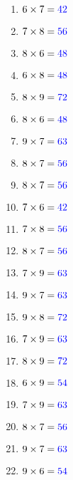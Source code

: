 \documentclass[11pt]{article}\usepackage[a4paper,margin=0.90in,tmargin=0.5in]{geometry}\usepackage{amsmath, amsthm, amssymb}
\begin{document}
\begin{multicols*}{4}
\begin{enumerate}[itemsep=2.3\baselineskip]
\item $6 \times 7 = { \color[rgb]{0,0,1} 42 }$ 
\item $7 \times 8 = { \color[rgb]{0,0,1} 56 }$ 
\item $8 \times 6 = { \color[rgb]{0,0,1} 48 }$ 
\item $6 \times 8 = { \color[rgb]{0,0,1} 48 }$ 
\item $8 \times 9 = { \color[rgb]{0,0,1} 72 }$ 
\item $8 \times 6 = { \color[rgb]{0,0,1} 48 }$ 
\item $9 \times 7 = { \color[rgb]{0,0,1} 63 }$ 
\item $8 \times 7 = { \color[rgb]{0,0,1} 56 }$ 
\item $8 \times 7 = { \color[rgb]{0,0,1} 56 }$ 
\item $7 \times 6 = { \color[rgb]{0,0,1} 42 }$ 
\item $7 \times 8 = { \color[rgb]{0,0,1} 56 }$ 
\item $8 \times 7 = { \color[rgb]{0,0,1} 56 }$ 
\item $7 \times 9 = { \color[rgb]{0,0,1} 63 }$ 
\item $9 \times 7 = { \color[rgb]{0,0,1} 63 }$ 
\item $9 \times 8 = { \color[rgb]{0,0,1} 72 }$ 
\item $7 \times 9 = { \color[rgb]{0,0,1} 63 }$ 
\item $8 \times 9 = { \color[rgb]{0,0,1} 72 }$ 
\item $6 \times 9 = { \color[rgb]{0,0,1} 54 }$ 
\item $7 \times 9 = { \color[rgb]{0,0,1} 63 }$ 
\item $8 \times 7 = { \color[rgb]{0,0,1} 56 }$ 
\item $9 \times 7 = { \color[rgb]{0,0,1} 63 }$ 
\item $9 \times 6 = { \color[rgb]{0,0,1} 54 }$ 
\end{enumerate}
\vfill
\end{multicols*}
\end{document}

